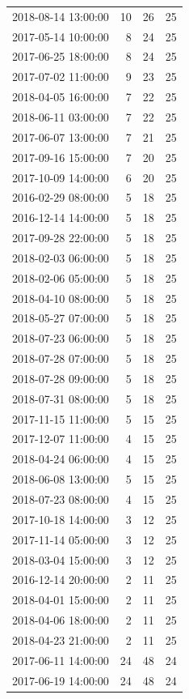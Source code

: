 \begin{tabular}{lrrr}
2018-08-14 13:00:00 & 10 & 26 & 25 \\
2017-05-14 10:00:00 & 8 & 24 & 25 \\
2017-06-25 18:00:00 & 8 & 24 & 25 \\
2017-07-02 11:00:00 & 9 & 23 & 25 \\
2018-04-05 16:00:00 & 7 & 22 & 25 \\
2018-06-11 03:00:00 & 7 & 22 & 25 \\
2017-06-07 13:00:00 & 7 & 21 & 25 \\
2017-09-16 15:00:00 & 7 & 20 & 25 \\
2017-10-09 14:00:00 & 6 & 20 & 25 \\
2016-02-29 08:00:00 & 5 & 18 & 25 \\
2016-12-14 14:00:00 & 5 & 18 & 25 \\
2017-09-28 22:00:00 & 5 & 18 & 25 \\
2018-02-03 06:00:00 & 5 & 18 & 25 \\
2018-02-06 05:00:00 & 5 & 18 & 25 \\
2018-04-10 08:00:00 & 5 & 18 & 25 \\
2018-05-27 07:00:00 & 5 & 18 & 25 \\
2018-07-23 06:00:00 & 5 & 18 & 25 \\
2018-07-28 07:00:00 & 5 & 18 & 25 \\
2018-07-28 09:00:00 & 5 & 18 & 25 \\
2018-07-31 08:00:00 & 5 & 18 & 25 \\
2017-11-15 11:00:00 & 5 & 15 & 25 \\
2017-12-07 11:00:00 & 4 & 15 & 25 \\
2018-04-24 06:00:00 & 4 & 15 & 25 \\
2018-06-08 13:00:00 & 5 & 15 & 25 \\
2018-07-23 08:00:00 & 4 & 15 & 25 \\
2017-10-18 14:00:00 & 3 & 12 & 25 \\
2017-11-14 05:00:00 & 3 & 12 & 25 \\
2018-03-04 15:00:00 & 3 & 12 & 25 \\
2016-12-14 20:00:00 & 2 & 11 & 25 \\
2018-04-01 15:00:00 & 2 & 11 & 25 \\
2018-04-06 18:00:00 & 2 & 11 & 25 \\
2018-04-23 21:00:00 & 2 & 11 & 25 \\
2017-06-11 14:00:00 & 24 & 48 & 24 \\
2017-06-19 14:00:00 & 24 & 48 & 24 \\

\end{tabular}
